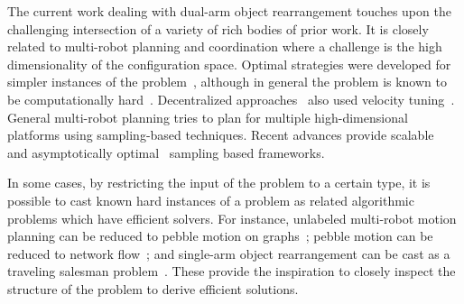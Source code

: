 %
The current work dealing with dual-arm object rearrangement touches upon the challenging intersection of a variety of rich bodies of prior work. It is closely related to multi-robot planning and coordination where a challenge is the high dimensionality of the configuration space. %
Optimal strategies were developed for simpler instances of the problem~\cite{SolYuZamHal15}, although in general the problem is known to be computationally hard~\cite{solovey2016hardness}. Decentralized approaches~\cite{van2005prioritized} also used velocity tuning~\cite{leroy1999multiple}. General multi-robot planning tries to plan for multiple high-dimensional platforms \cite{wagner2012probabilistic,Gharbi:2009fu} using sampling-based techniques. 
Recent advances provide scalable~\cite{SoloveySH16:ijrr} and asymptotically optimal~\cite{Dobson:2017aa,Shome2019} sampling based frameworks. 


In some cases, by restricting the input of the problem to a certain type, it is possible to cast known hard instances of a problem as related algorithmic problems which have efficient solvers. For instance, unlabeled multi-robot motion planning can be reduced to pebble motion on graphs~\cite{abhs-unlabeled14}; pebble motion can be reduced to network flow~\cite{yu2016optimal}; and single-arm object rearrangement can be cast as a traveling salesman problem~\cite{193}. These provide the inspiration to closely inspect the structure of the problem to derive efficient solutions.


